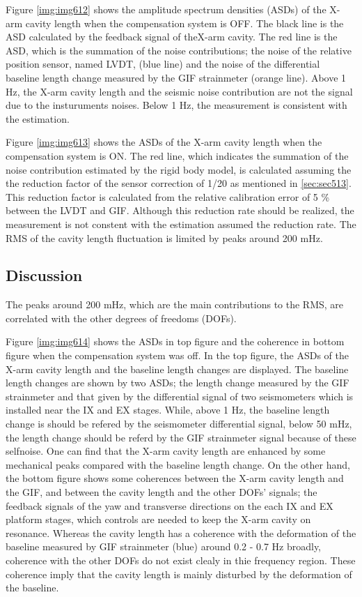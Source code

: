 Figure \ref{img:img612} shows the amplitude spectrum densities (ASDs) of the X-arm cavity length when the compensation system is OFF. The black line is the ASD calculated by the feedback signal of theX-arm cavity. The red line is the ASD, which is the summation of the noise contributions; the noise of the relative position sensor, named LVDT, (blue line) and the noise of the differential baseline length change measured by the GIF strainmeter (orange line). Above 1 Hz, the X-arm cavity length and the seismic noise contribution are not the signal due to the insturuments noises. Below 1 Hz, the measurement is consistent with the estimation.

Figure \ref{img:img613} shows the ASDs of the X-arm cavity length when the compensation system is ON. The red line, which indicates the summation of the noise contribution estimated by the rigid body model, is calculated assuming the the reduction factor of the sensor correction of 1/20 as mentioned in \cref{sec:sec513}. This reduction factor is calculated from the relative calibration error of 5 \% between the LVDT and GIF. Although this reduction rate should be realized, the measurement is not constent with the estimation assumed the reduction rate. The RMS of the cavity length fluctuation is limited by peaks around 200 mHz.

\subsection{Discussion}
The peaks around 200 mHz, which are the main contributions to the RMS, are correlated with the other degrees of freedoms (DOFs). 

Figure \ref{img:img614} shows the ASDs in top figure and the coherence in bottom figure when the compensation system was off. In the top figure, the ASDs of the X-arm cavity length and the baseline length changes are displayed. The baseline length changes are shown by two ASDs; the length change measured by the GIF strainmeter and that given by the differential signal of two seismometers which is installed near the IX and EX stages. While, above 1 Hz, the baseline length change is should be refered by the seismometer differential signal, below 50 mHz, the length change should be referd by the GIF strainmeter signal because of these selfnoise. One can find that the X-arm cavity length are enhanced by some mechanical peaks compared with the baseline length change. On the other hand, the bottom figure shows some coherences between the X-arm cavity length and the GIF, and between the cavity length and the other DOFs' signals; the feedback signals of the yaw and transverse directions on the each IX and EX platform stages, which controls are needed to keep the X-arm cavity on resonance. Whereas the cavity length has a coherence with the deformation of the baseline measured by GIF strainmeter (blue) around 0.2 - 0.7 Hz broadly, coherence with the other DOFs do not exist clealy in thie frequency region. These coherence imply that the cavity length is mainly disturbed by the deformation of the baseline.


